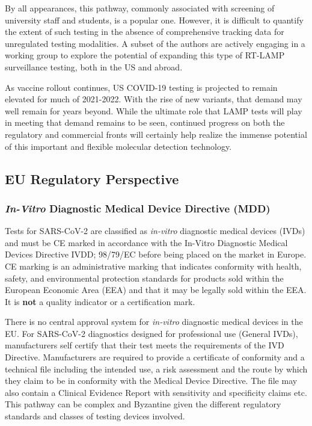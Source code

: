             By all appearances, this pathway, commonly associated with screening of university staff and students, is a popular one. However, it is difficult to quantify the extent of such testing in the absence of comprehensive tracking data for unregulated testing modalities. A subset of the authors are actively engaging in a working group to explore the potential of expanding this type of RT-LAMP surveillance testing, both in the US and abroad.

            As vaccine rollout continues, US COVID-19 testing is projected to remain elevated for much of 2021-2022. With the rise of new variants, that demand may well remain for years beyond. While the ultimate role that LAMP tests will play in meeting that demand remains to be seen, continued progress on both the regulatory and commercial fronts will certainly help realize the immense potential of this important and flexible molecular detection technology.

    \subsection{EU Regulatory Perspective}

        \subsubsection{\emph{In-Vitro} Diagnostic Medical Device Directive (MDD)}

            Tests for SARS-CoV-2 are classified as \emph{in-vitro} diagnostic medical devices (IVDs) and must be CE marked in accordance with the In-Vitro Diagnostic Medical Devices Directive IVDD; 98/79/EC before being placed on the market in Europe. CE marking is an administrative marking that indicates conformity with health, safety, and environmental protection standards for products sold within the European Economic Area (EEA) and that it may be legally sold within the EEA. It is \textbf{not} a quality indicator or a certification mark.

            There is no central approval system for \emph{in-vitro} diagnostic medical devices in the EU. For SARS-CoV-2 diagnostics designed for professional use (General IVDs), manufacturers self certify that their test meets the requirements of the IVD Directive. Manufacturers are required to provide a certificate of conformity and a technical file including the intended use, a risk assessment and the route by which they claim to be in conformity with the Medical Device Directive. The file may also contain a Clinical Evidence Report with sensitivity and specificity claims etc. This pathway can be complex and Byzantine given the different regulatory standards and classes of testing devices involved. 

